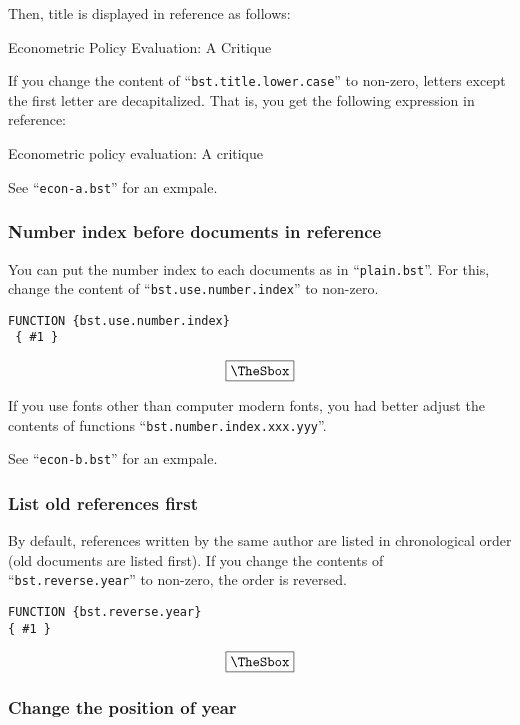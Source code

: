 \documentclass[10pt]{article}
\newenvironment{Frame}%
{\setlength{\fboxsep}{15pt}
\setlength{\mylength}{\linewidth}%
\addtolength{\mylength}{-2\fboxsep}%
\addtolength{\mylength}{-2\fboxrule}%
\Sbox
\minipage{\mylength}%
\setlength{\abovedisplayskip}{0pt}%
\setlength{\belowdisplayskip}{0pt}%
}%
{\endminipage\endSbox
\[\fbox{\TheSbox}\]}
\begin{document}
Then, title is displayed in reference as follows:
\begin{center}
 Econometric Policy Evaluation: A Critique
\end{center}

If you change the content of ``\texttt{bst.title.lower.case}'' to
non-zero, letters except the first letter are decapitalized.  That is,
you get the following expression in reference:
\begin{center}
 Econometric policy evaluation: A critique
\end{center}

See ``\texttt{econ-a.bst}'' for an exmpale.


\subsubsection{Number index before documents in reference}

You can put the number index to each documents as in
``\texttt{plain.bst}''.  For this, change the content of
``\texttt{bst.use.number.index}'' to non-zero.
\begin{Frame}
\begin{verbatim}
FUNCTION {bst.use.number.index}
 { #1 }
\end{verbatim}
\end{Frame}

If you use fonts other than computer modern fonts, you had better adjust
the contents of functions ``\texttt{bst.number.index.xxx.yyy}''.

See ``\texttt{econ-b.bst}'' for an exmpale.


\subsubsection{List old references first}

By default, references written by the same author are listed in
chronological order (old documents are listed first).  If you change the
contents of ``\texttt{bst.reverse.year}'' to non-zero, the order is
reversed.
\begin{Frame}
\begin{verbatim}
FUNCTION {bst.reverse.year}
{ #1 }
\end{verbatim}
\end{Frame}

\subsubsection{Change the position of year}
\end{document}
